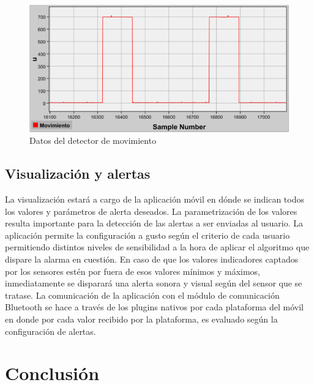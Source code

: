 \documentclass{IEEEtran}
\begin{document}
				\begin{figure}
					\centering
					\includegraphics[width=1\linewidth]{movimiento}
					\caption{Datos del detector de movimiento}
					\label{movimiento}
				\end{figure}

		\subsection{Visualización y alertas}

			La visualización estará a cargo de la aplicación móvil en dónde se indican todos los valores y parámetros de alerta deseados.
			La parametrización de los valores resulta importante para la detección de las alertas a ser enviadas al usuario. La aplicación permite la configuración a gusto según el criterio de cada usuario permitiendo distintos niveles de sensibilidad a la hora de aplicar el algoritmo que dispare la alarma en cuestión. En caso de que los valores indicadores captados por los sensores estén por fuera de esos valores mínimos y máximos, inmediatamente se disparará una alerta sonora y visual según del sensor que se tratase.
			La comunicación de la aplicación con el módulo de comunicación Bluetooth se hace a través de los plugins nativos por cada plataforma del móvil \cite{npmbluetooth} en donde por cada valor recibido por la plataforma, es evaluado según la configuración de alertas.

	\section{Conclusión}
\end{document}
